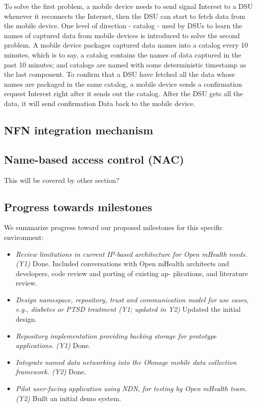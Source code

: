 \documentclass{article}
\begin{document}
To solve the first problem, a mobile device needs to send signal Interest to a DSU whenever it reconnects the Internet, then the DSU can start to fetch data from the mobile device.  One level of direction - catalog - used by DSUs to learn the names of captured data from mobile devices is introduced to solve the second problem. A mobile device packages captured data names into a catalog every 10 minutes, which is to say, a catalog contains the names of data captured in the past 10 minutes; and catalogs are named with some deterministic timestamp as the last component. To confirm that a DSU have fetched all the data whose names are packaged in the same catalog, a mobile device sends a confirmation request Interest right after it sends out the catalog. After the DSU gets all the data, it will send confirmation Data back to the mobile device. 

\subsection{NFN integration mechanism}


\subsection{Name-based access control (NAC)}
This will be covered by other section?

\subsection{Progress towards milestones}
We summarize progress toward our proposed milestones for this specific environment:
\begin{itemize}
	\item \textit{Review limitations in current IP-based architecture for Open mHealth needs. (Y1)} Done. Included conversations with Open mHealth architects and developers, code review and porting of existing ap- plications, and literature review. 
	\item \textit{Design namespace, repository, trust and communication model for use cases, e.g., diabetes or PTSD treatment (Y1; updated in Y2)} Updated the initial design.
	\item \textit {Repository implementation providing backing storage for prototype applications. (Y1)} Done.
	\item \textit {Integrate named data networking into the Ohmage mobile data collection framework. (Y2)} Done.
	\item \textit {Pilot user-facing application using NDN, for testing by Open mHealth team. (Y2)} Built an initial demo system.
\end{itemize}
\end{document}
